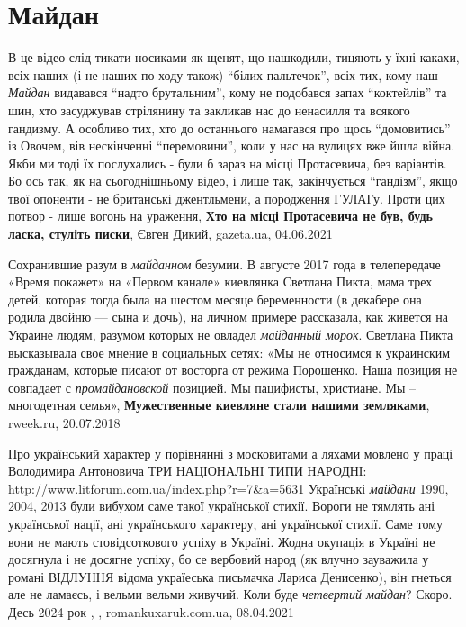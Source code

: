  
 
 
 
 
\chapter{Майдан}
\label{sec:slova.maidan}

В це відео слід тикати носиками як щенят, що нашкодили, тицяють у їхні какахи,
всіх наших (і не наших по ходу також) \enquote{білих пальтечок}, всіх тих, кому
наш \emph{Майдан} видавався \enquote{надто брутальним}, кому не подобався запах
\enquote{коктейлів} та шин, хто засуджував стрілянину та закликав нас до
ненасилля та всякого гандизму. А особливо тих, хто до останнього намагався про
щось \enquote{домовитись} із Овочем, вів нескінченні \enquote{перемовини}, коли
у нас на вулицях вже йшла війна.  Якби ми тоді їх послухались - були б зараз на
місці Протасевича, без варіантів.  Бо ось так, як на сьогоднішньому відео, і
лише так, закінчується \enquote{гандізм}, якщо твої опоненти - не британські
джентльмени, а породження ГУЛАГу. Проти цих потвор - лише вогонь на ураження,
\textbf{Хто на місці Протасевича не був, будь ласка, стуліть писки},
Євген Дикий, gazeta.ua, 04.06.2021

Сохранившие разум в \emph{майданном} безумии. В августе 2017 года в телепередаче
«Время покажет» на «Первом канале» киевлянка Светлана Пикта, мама трех детей,
которая тогда была на шестом месяце беременности (в декабере она родила двойню
— сына и дочь), на личном примере рассказала, как живется на Украине людям,
разумом которых не овладел \emph{майданный морок}. Светлана Пикта высказывала свое
мнение в социальных сетях: «Мы не относимся к украинским гражданам, которые
писают от восторга от режима Порошенко. Наша позиция не совпадает с
\emph{промайдановской} позицией. Мы пацифисты, христиане. Мы – многодетная семья»,
\textbf{Мужественные киевляне стали нашими земляками}, rweek.ru, 20.07.2018


Про український характер у порівнянні з московитами а ляхами мовлено у праці
Володимира Антоновича ТРИ НАЦІОНАЛЬНІ ТИПИ НАРОДНІ:
\url{http://www.litforum.com.ua/index.php?r=7&a=5631} Українські \emph{майдани}
1990, 2004, 2013 були вибухом саме такої української стихії.  Вороги не тямлять
ані української нації, ані українського характеру, ані української стихії. Саме
тому вони не мають стовідсоткового успіху в Україні.  Жодна окупація в Україні
не досягнула і не досягне успіху, бо се вербовий народ (як влучно зауважила у
романі ВІДЛУННЯ відома україеська письмачка Лариса Денисенко), він гнеться але
не ламаєсь, і вельми вельми живучий.  Коли буде \emph{четвертий майдан}?
Скоро.  Десь 2024 рок
, 
, romankuxaruk.com.ua, 08.04.2021


